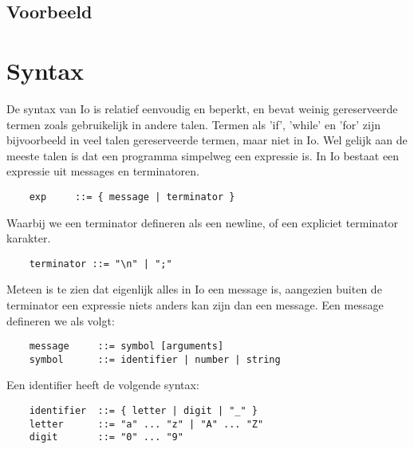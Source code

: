 \documentclass[12pt]{article}
\begin{document}
\subsection*{Voorbeeld}


\section{Syntax}

De syntax van Io is relatief eenvoudig en beperkt, en bevat weinig gereserveerde termen zoals gebruikelijk in andere talen. Termen als 'if', 'while' en 'for' zijn bijvoorbeeld in veel talen gereserveerde termen, maar niet in Io. Wel gelijk aan de meeste talen is dat een programma simpelweg een expressie is. In Io bestaat een expressie uit messages en terminatoren.

\begin{lstlisting}
	exp		::= { message | terminator }
\end{lstlisting}
Waarbij we een terminator defineren als een newline, of een expliciet terminator karakter.
\begin{lstlisting}
	terminator ::= "\n" | ";"
\end{lstlisting}
Meteen is te zien dat eigenlijk alles in Io een message is, aangezien buiten de terminator een expressie niets anders kan zijn dan een message. Een message defineren we als volgt:
\begin{lstlisting}
	message		::= symbol [arguments]
	symbol		::= identifier | number | string
\end{lstlisting}

Een identifier heeft de volgende syntax:
\begin{lstlisting}
	identifier 	::= { letter | digit | "_" }
	letter 		::= "a" ... "z" | "A" ... "Z"
	digit 		::= "0" ... "9"
\end{lstlisting}
\end{document}
